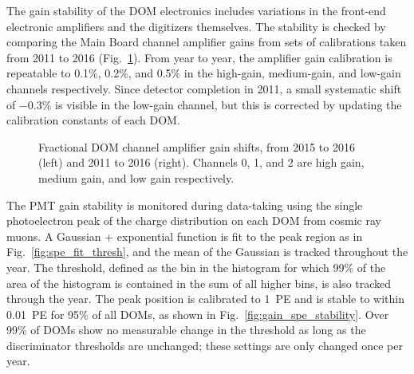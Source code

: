 The gain stability of the DOM electronics includes variations in the
front-end electronic amplifiers and the digitizers themselves.  The
stability is checked by comparing the Main Board channel amplifier gains
from sets of calibrations taken from 2011 to 2016
(Fig.~\ref{fig:domcal_ch_gain}).  From year to year, the amplifier gain 
calibration is repeatable to 0.1\%, 0.2\%, and 0.5\% in the high-gain,
medium-gain, and low-gain channels respectively.  Since detector completion
in 2011, a small systematic shift of $-0.3\%$ is visible in the low-gain
channel, but this is corrected by updating the calibration constants of
each DOM.

\begin{figure}[!h]
  \captionsetup[subfigure]{labelformat=empty}
  \centering
  \caption{Fractional DOM channel amplifier gain shifts, from 2015 to
    2016 (left) and 2011 to 2016 (right).  Channels 0, 1, and 2 are
    high gain, medium gain, and low gain respectively.}
  \label{fig:domcal_ch_gain}
\end{figure}

The PMT gain stability is monitored during data-taking using the
single photoelectron peak of the charge distribution on each DOM from
cosmic ray muons. A
Gaussian + exponential function is fit to the peak region as in
Fig.~\ref{fig:spe_fit_thresh}, and the mean of the Gaussian is
tracked throughout the year. The threshold, defined as the bin in the histogram for which 99\% of the area of the histogram is contained in the sum of all higher bins, is also tracked through
the year. The peak position is calibrated to 1~PE
and is stable to within 0.01~PE for 95\% of all DOMs, as shown in
Fig.~\ref{fig:gain_spe_stability}. Over 99\% of DOMs show no
measurable change in the threshold as long as the discriminator
thresholds are unchanged; these settings are only changed once per year.


